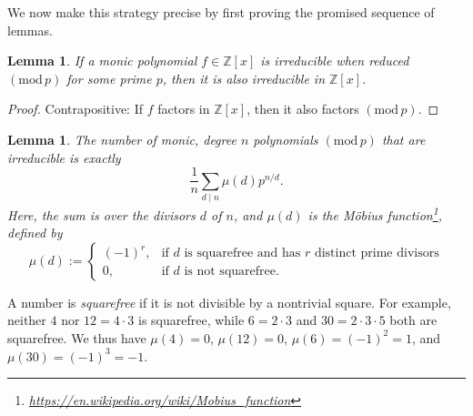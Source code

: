 \documentclass[12pt]{amsart}
\newtheorem{lemma}[theorem]{Lemma}
\theoremstyle{definition} \newtheorem*{notation}{Notation}
\theoremstyle{remark} \newtheorem*{remark}{Remark}
\theoremstyle{remark} \newtheorem*{example}{Example}
\theoremstyle{definition} \newtheorem*{definition}{Definition}
\numberwithin{equation}{section}
\numberwithin{theorem}{section}
\renewcommand{\pmod}[1]{\left(\mathrm{mod}\,#1\right)}
\begin{document}
	We now make this strategy precise by first proving the promised sequence of lemmas.
	
	\begin{lemma}\label{lem:irred-test}
		If a monic polynomial $f \in \mathbb{Z}[x]$ is irreducible when reduced $\pmod{p}$ for some prime $p$, then it is also irreducible in $\mathbb{Z}[x]$.
	\end{lemma}
	\begin{proof}
		Contrapositive: If $f$ factors in $\mathbb{Z}[x]$, then it also factors $\pmod{p}$.
	\end{proof}
	
	\begin{lemma}\label{lem:irred-mod-p}
		The number of monic, degree $n$ polynomials $\pmod{p}$ that are irreducible is exactly
			\[
				\frac{1}{n} \sum_{d \mid n} \mu(d) p^{n/d}.
			\]
		Here, the sum is over the divisors $d$ of $n$, and $\mu(d)$ is the M\"obius function\footnote{\url{https://en.wikipedia.org/wiki/Mobius_function}}, defined by
			\[
				\mu(d) := \begin{cases}
					(-1)^r, & \text{if $d$ is squarefree and has $r$ distinct prime divisors} \\
					0, & \text{if $d$ is not squarefree.}
					\end{cases}
			\]
	\end{lemma}
	A number is \emph{squarefree} if it is not divisible by a nontrivial square.  For example, neither $4$ nor $12=4\cdot 3$ is squarefree, while $6=2\cdot 3$ and $30=2\cdot 3 \cdot 5$ both are squarefree.  We thus have $\mu(4)=0$, $\mu(12)=0$, $\mu(6)=(-1)^2=1$, and $\mu(30)=(-1)^3=-1$.  
	
\end{document}
